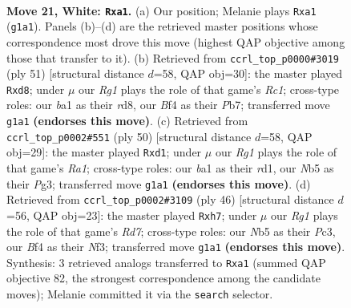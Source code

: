 \documentclass[11pt]{article}
\begin{document}
\clearpage

\begin{figure}[p]\centering
\begin{subfigure}{0.46\textwidth}\centering
\resizebox{\linewidth}{!}{%
\newchessgame
\chessboard[
  setfen={2k3r1/1ppnp2p/2n3p1/pN6/5B1P/5P2/P1P1KP2/b5R1 w - - 0 21},
  showmover=false,
  pgfstyle=straightmove, color=movearrow, markmove={g1-a1}
]}
\caption{}
\end{subfigure}\hfill
\begin{subfigure}{0.46\textwidth}\centering
\resizebox{\linewidth}{!}{%
\newchessgame
\chessboard[
  setfen={2rR4/1p3pk1/p5p1/6p1/1N2P3/P6P/1nP2PP1/2R3K1 b - - 0 26},
  showmover=false,
  pgfstyle=straightmove, color=movearrow, markmove={c8-d8}
]}
\caption{}
\end{subfigure}
\\[4pt]
\begin{subfigure}{0.46\textwidth}\centering
\resizebox{\linewidth}{!}{%
\newchessgame
\chessboard[
  setfen={r4k2/p4pp1/1p3n1p/1N2p3/1P6/6P1/1P2PP1P/R2r2K1 w - - 0 26},
  showmover=false,
  pgfstyle=straightmove, color=movearrow, markmove={a1-d1}
]}
\caption{}
\end{subfigure}\hfill
\begin{subfigure}{0.46\textwidth}\centering
\resizebox{\linewidth}{!}{%
\newchessgame
\chessboard[
  setfen={r7/p2R3p/1p2pkp1/2p5/2n5/2P2N2/P4PPP/5K2 w - - 2 24},
  showmover=false,
  pgfstyle=straightmove, color=movearrow, markmove={d7-h7}
]}
\caption{}
\end{subfigure}
\caption{\textbf{Move 21, White: \texttt{Rxa1}.} (a) Our position; Melanie plays \texttt{Rxa1} (\texttt{g1a1}). Panels (b)--(d) are the retrieved master positions whose correspondence most drove this move (highest QAP objective among those that transfer to it). (b) Retrieved from \texttt{ccrl\_top\_p0000\#3019} (ply 51) [structural distance $d$=58, QAP obj=30]: the master played \texttt{Rxd8}; under $\mu$ our \emph{Rg1} plays the role of that game's \emph{Rc1}; cross-type roles: our \emph{b}a1 as their \emph{r}d8, our \emph{B}f4 as their \emph{P}b7; transferred move \texttt{g1a1} \textbf{(endorses this move)}. (c) Retrieved from \texttt{ccrl\_top\_p0002\#551} (ply 50) [structural distance $d$=58, QAP obj=29]: the master played \texttt{Rxd1}; under $\mu$ our \emph{Rg1} plays the role of that game's \emph{Ra1}; cross-type roles: our \emph{b}a1 as their \emph{r}d1, our \emph{N}b5 as their \emph{P}g3; transferred move \texttt{g1a1} \textbf{(endorses this move)}. (d) Retrieved from \texttt{ccrl\_top\_p0002\#3109} (ply 46) [structural distance $d$=56, QAP obj=23]: the master played \texttt{Rxh7}; under $\mu$ our \emph{Rg1} plays the role of that game's \emph{Rd7}; cross-type roles: our \emph{N}b5 as their \emph{P}c3, our \emph{B}f4 as their \emph{N}f3; transferred move \texttt{g1a1} \textbf{(endorses this move)}. Synthesis: 3 retrieved analogs transferred to \texttt{Rxa1} (summed QAP objective 82, the strongest correspondence among the candidate moves); Melanie committed it via the \texttt{search} selector.}
\label{fig:thought-m40}
\end{figure}
\end{document}
